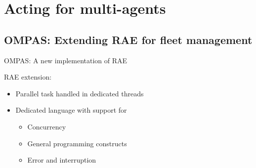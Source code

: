 \section{Acting for multi-agents}
\subsection{OMPAS: Extending RAE for fleet management}
\begin{frame}{OMPAS: A new implementation of RAE}
    
            RAE extension:
    \begin{itemize}
        \item Parallel task handled in dedicated threads
        \item Dedicated language with support for
        \begin{itemize}
            \item Concurrency
            \item General programming constructs
            \item Error and interruption
        \end{itemize}
    \end{itemize}  
    
\end{frame}

